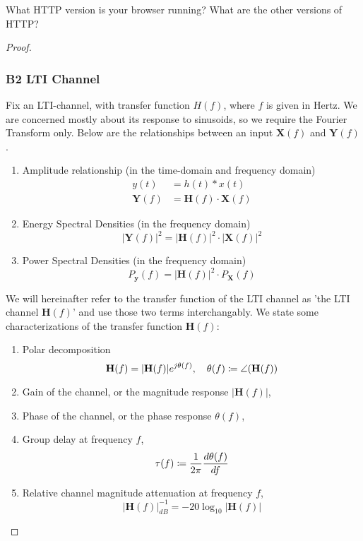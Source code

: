 \documentclass[../../main.tex]{subfiles}
\begin{document}
\begin{wts}
What HTTP version is your browser running? What are the other versions of HTTP?
\end{wts}
\begin{proof}
\newcommand{\pxf}{P_{\mathbf{X}}(f)}
\newcommand{\pyf}{P_{\mathbf{y}}(f)}
\newcommand{\hf}{\mathbf{H}(f)}
\newcommand{\xf}{\mathbf{X}(f)}
\newcommand{\yf}{\mathbf{Y}(f)}
\subsubsection*{B2 LTI Channel}
Fix an LTI-channel, with transfer function $H(f)$, where $f$ is given in Hertz. We are concerned mostly about its response to sinusoids, so we require the Fourier Transform only. Below are the relationships between an input $\mathbf{X}(f)$ and $\mathbf{Y}(f)$.
\begin{enumerate}
    \item Amplitude relationship (in the time-domain and frequency domain)
    \begin{align*}
        y(t)&=h(t)\ast x(t)\\[2ex]
        \yf&=\mathbf{H}(f)\cdot\xf
    \end{align*}
    \item Energy Spectral Densities (in the frequency domain)
        \[
        |\yf|^2=|\mathbf{H}(f)|^2\cdot|\xf|^2
        \]
    \item Power Spectral Densities (in the frequency domain)
        \[
        \pyf = |\mathbf{H}(f)|^2\cdot\pxf
        \]
\end{enumerate}
We will hereinafter refer to the transfer function of the LTI channel as 'the LTI channel $\hf$' and use those two terms interchangably. We state some characterizations of the transfer function $\hf$:
\begin{enumerate}
    \item Polar decomposition
    \[
    \hf =|\hf|e^{j\theta(f)},\quad\theta(f)\defined\angle(\hf)
    \]
    \item Gain of the channel, or the magnitude response $|\hf|$,
    \item Phase of the channel, or the phase response $\theta(f)$,
    \item Group delay at frequency $f$,
    \[
    \tau(f)\coloneqq \dfrac{1}{2\pi}\dfrac{d\theta(f)}{df}
    \]
    \item Relative channel magnitude attenuation at frequency $f$,
    \[
    |\hf|_{dB}^{-1} = -20\log_{10}|\hf|
    \]
\end{enumerate}

\end{proof}
\end{document}
